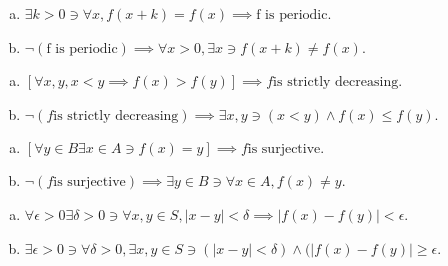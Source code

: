 \documentclass[12pt]{scrartcl} %
\begin{document}
\begin{enumerate}[(a)]
	\item $\exists k > 0 \ni \forall x, f(x + k) = f(x) \implies \text{f is periodic}$.
	\item $\neg(\text{f is periodic}) \implies \forall x > 0, \exists x \ni f(x + k) \neq f(x)$.
\end{enumerate}
\begin{enumerate}[(a)]
	\item $[\forall x, y, x < y \implies f(x) > f(y)] \implies f \text{is strictly decreasing}$.
	\item $\neg(f \text{is strictly decreasing}) \implies \exists x, y \ni (x < y) \land f(x) \leq f(y)$.
\end{enumerate}
\begin{enumerate}[(a)]
	\item $[\forall y \in B \exists x \in A \ni f(x) = y] \implies f \text{is surjective}.$
	\item $\neg(f \text{is surjective}) \implies \exists y \in B \ni \forall x \in A, f(x) \neq y$.
\end{enumerate}
\begin{enumerate}[(a)]
	\item $\forall \epsilon > 0 \exists \delta > 0 \ni \forall x, y \in S, \lvert x - y \rvert < \delta \implies \lvert f(x) - f(y) \rvert < \epsilon$.
	\item $\exists \epsilon > 0 \ni \forall \delta > 0, \exists x, y \in S \ni (\lvert x - y \rvert < \delta) \land (\lvert f(x) - f(y) \rvert \geq \epsilon.$
\end{enumerate}
\end{document}
